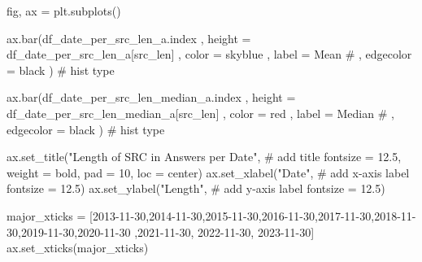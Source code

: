 \documentclass[
  letterpaper,
  DIV=11,
  numbers=noendperiod]{scrartcl}
\newenvironment{Shaded}{\begin{snugshade}}{\end{snugshade}}
\newcommand{\CommentTok}[1]{\textcolor[rgb]{0.37,0.37,0.37}{#1}}
\newcommand{\DecValTok}[1]{\textcolor[rgb]{0.68,0.00,0.00}{#1}}
\newcommand{\FloatTok}[1]{\textcolor[rgb]{0.68,0.00,0.00}{#1}}
\newcommand{\NormalTok}[1]{\textcolor[rgb]{0.00,0.23,0.31}{#1}}
\newcommand{\OperatorTok}[1]{\textcolor[rgb]{0.37,0.37,0.37}{#1}}
\newcommand{\StringTok}[1]{\textcolor[rgb]{0.13,0.47,0.30}{#1}}
\begin{document}
\begin{Shaded}
\begin{Highlighting}[]
\NormalTok{fig, ax }\OperatorTok{=}\NormalTok{ plt.subplots()}

\NormalTok{ax.bar(df\_date\_per\_src\_len\_a.index}
\NormalTok{    ,  height }\OperatorTok{=}\NormalTok{ df\_date\_per\_src\_len\_a[}\StringTok{\textquotesingle{}src\_len\textquotesingle{}}\NormalTok{]}
\NormalTok{    ,  color }\OperatorTok{=} \StringTok{\textquotesingle{}skyblue\textquotesingle{}}
\NormalTok{    ,  label }\OperatorTok{=} \StringTok{\textquotesingle{}Mean\textquotesingle{}}
    \CommentTok{\# ,  edgecolor = \textquotesingle{}black\textquotesingle{}}
\NormalTok{      ) }\CommentTok{\# hist type}

\NormalTok{ax.bar(df\_date\_per\_src\_len\_median\_a.index}
\NormalTok{    ,  height }\OperatorTok{=}\NormalTok{ df\_date\_per\_src\_len\_median\_a[}\StringTok{\textquotesingle{}src\_len\textquotesingle{}}\NormalTok{]}
\NormalTok{    ,  color }\OperatorTok{=} \StringTok{\textquotesingle{}red\textquotesingle{}}
\NormalTok{    ,  label }\OperatorTok{=} \StringTok{\textquotesingle{}Median\textquotesingle{}}
    \CommentTok{\# ,  edgecolor = \textquotesingle{}black\textquotesingle{}}
\NormalTok{      ) }\CommentTok{\# hist type}

\NormalTok{ax.set\_title(}\StringTok{"Length  of SRC in Answers per Date"}\NormalTok{, }\CommentTok{\# add title}
\NormalTok{             fontsize }\OperatorTok{=} \FloatTok{12.5}\NormalTok{,}
\NormalTok{             weight }\OperatorTok{=} \StringTok{\textquotesingle{}bold\textquotesingle{}}\NormalTok{,}
\NormalTok{             pad }\OperatorTok{=} \DecValTok{10}\NormalTok{,}
\NormalTok{             loc }\OperatorTok{=} \StringTok{\textquotesingle{}center\textquotesingle{}}\NormalTok{)}
\NormalTok{ax.set\_xlabel(}\StringTok{"Date"}\NormalTok{, }\CommentTok{\# add x{-}axis label}
\NormalTok{              fontsize }\OperatorTok{=} \FloatTok{12.5}\NormalTok{)}
\NormalTok{ax.set\_ylabel(}\StringTok{"Length"}\NormalTok{, }\CommentTok{\# add y{-}axis label}
\NormalTok{              fontsize }\OperatorTok{=} \FloatTok{12.5}\NormalTok{)}

\NormalTok{major\_xticks }\OperatorTok{=}\NormalTok{ [}\StringTok{\textquotesingle{}2013{-}11{-}30\textquotesingle{}}\NormalTok{,}\StringTok{\textquotesingle{}2014{-}11{-}30\textquotesingle{}}\NormalTok{,}\StringTok{\textquotesingle{}2015{-}11{-}30\textquotesingle{}}\NormalTok{,}\StringTok{\textquotesingle{}2016{-}11{-}30\textquotesingle{}}\NormalTok{,}\StringTok{\textquotesingle{}2017{-}11{-}30\textquotesingle{}}\NormalTok{,}\StringTok{\textquotesingle{}2018{-}11{-}30\textquotesingle{}}\NormalTok{,}\StringTok{\textquotesingle{}2019{-}11{-}30\textquotesingle{}}\NormalTok{,}\StringTok{\textquotesingle{}2020{-}11{-}30\textquotesingle{}}
\NormalTok{                ,}\StringTok{\textquotesingle{}2021{-}11{-}30\textquotesingle{}}\NormalTok{, }\StringTok{\textquotesingle{}2022{-}11{-}30\textquotesingle{}}\NormalTok{, }\StringTok{\textquotesingle{}2023{-}11{-}30\textquotesingle{}}\NormalTok{]}
\NormalTok{ax.set\_xticks(major\_xticks)}


\end{Highlighting}
\end{Shaded}
\end{document}
